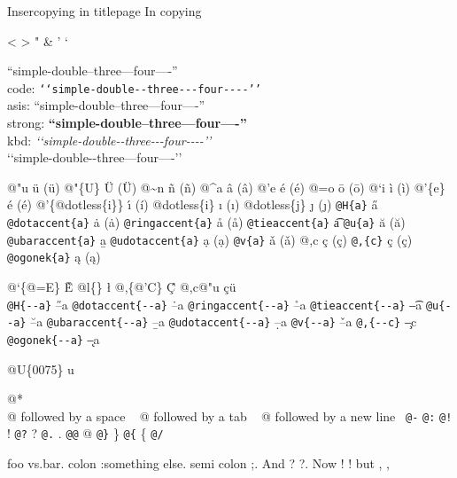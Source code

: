 \documentclass{book}
\newcommand\Texinfocommandstyletextkbd[1]{{\ttfamily\textsl{#1}}}%
\renewcommand{\_}{\Texinfounderscore\discretionary{}{}{}}
\begin{document}
\begin{titlepage}
Insercopying in titlepage
In copying

<
>
"
\&
'
`

``simple-double--three---four----''\leavevmode{}\\
code: \texttt{{`}{`}simple-double{-}{-}three{-}{-}{-}four{-}{-}{-}-{'}{'}} \leavevmode{}\\
asis: ``simple-double--three---four----'' \leavevmode{}\\
strong: \textbf{``simple-double--three---four----''} \leavevmode{}\\
kbd: \Texinfocommandstyletextkbd{{`}{`}simple-double{-}{-}three{-}{-}{-}four{-}{-}{-}-{'}{'}} \leavevmode{}\\

`\hbox{}`simple-double-\hbox{}-three---four----'\hbox{}'\leavevmode{}\\

%
%
%
%

@"u \"{u} (ü)
@"\{U\} \"{U} (Ü) 
@\~{}n \~{n} (ñ)
@\^{}a \^{a} (â)
@'e \'{e} (é)
@=o \={o} (ō)
@`i \`{i} (ì)
@'\{e\} \'{e} (é)
@'\{@dotless\{i\}\} \'{\i{}} (í)
@dotless\{i\} \i{} (ı)
@dotless\{j\} \j{} (ȷ)
\texttt{@H\{a\}} \H{a}
\texttt{@dotaccent\{a\}} \.{a} (ȧ)
\texttt{@ringaccent\{a\}} \r{a} (å)
\texttt{@tieaccent\{a\}} \t{a}
\texttt{@u\{a\}} \u{a} (ă)
\texttt{@ubaraccent\{a\}} \b{a}
\texttt{@udotaccent\{a\}} \d{a} (ạ)
\texttt{@v\{a\}} \v{a} (ǎ)
@,c \c{c} (ç)
\texttt{@,\{c\}} \c{c} (ç)
\texttt{@ogonek\{a\}} \k{a} (ą)

@`\{@=E\} \`{\={E}}
@l\{\} \l{}
@,\{@'C\} \c{\'{C}}
@,c@"u \c{c}\"{u} \leavevmode{}\\

\texttt{@H\{{-}{-}a\}} \H{--a}
\texttt{@dotaccent\{{-}{-}a\}} \.{--a}
\texttt{@ringaccent\{{-}{-}a\}} \r{--a}
\texttt{@tieaccent\{{-}{-}a\}} \t{--a}
\texttt{@u\{{-}{-}a\}} \u{--a}
\texttt{@ubaraccent\{{-}{-}a\}} \b{--a}
\texttt{@udotaccent\{{-}{-}a\}} \d{--a}
\texttt{@v\{{-}{-}a\}} \v{--a}
\texttt{@,\{{-}{-}c\}} \c{--c}
\texttt{@ogonek\{{-}{-}a\}} \k{--a}

@U\{0075\} u

@* \leavevmode{}\\
@ followed by a space
\ {}
@ followed by a tab
\ {}
@ followed by a new line
\ {}\texttt{@-} \-{}
\texttt{@:} \@
\texttt{@!} \@!
\texttt{@?} \@?
\texttt{@.} \@.
\texttt{@@} @
\texttt{@\}} \}
\texttt{@\{} \{
\texttt{@/} 

foo vs.\@ bar. 
colon :\@And something else.
semi colon ;\@.
And ? ?\@.
Now ! !\@@
but , ,\@


\end{titlepage}
\end{document}
